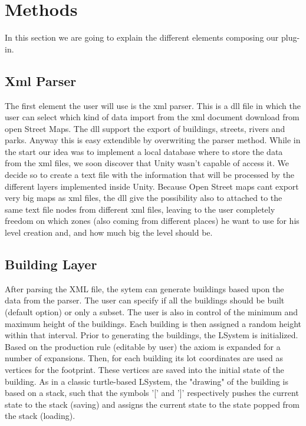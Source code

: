 \documentclass[conference]{IEEEtran}
\begin{document}
\section{Methods}

In this section we are going to explain the different elements composing our plug-in.

\subsection{Xml Parser}

The first element the user will use is the xml parser. This is a dll file in which the user can select which kind of data import from the xml document download from open Street Maps. The dll support the export of buildings, streets, rivers and parks. Anyway this is easy extendible by overwriting the parser method.
While in the start our idea was to implement a local database where to store the data from the xml files, we soon discover that Unity wasn't capable of access it. We decide so to create a text file with the information that will be processed by the different layers implemented inside Unity. Because Open Street maps cant export very big maps as xml files, the dll give the possibility also to attached to the same text file nodes from different xml files, leaving to the user completely freedom on which zones (also coming from different places) he want to use for his level creation and, and how much big the level should be.

\subsection{Building Layer}
After parsing the XML file, the sytem can generate buildings based upon the data from the parser. The user can specify if all the buildings should be built (default option) or only a subset. The user is also in control of the minimum and maximum height of the buildings. Each building is then assigned a random height within that interval. Prior to generating the buildings, the LSystem is initialized. Based on the production rule (editable by user) the axiom is expanded for a number of expansions. Then, for each building its lot coordinates are used as vertices for the footprint. These vertices are saved into the initial state of the building. As in a classic turtle-based LSystem, the "drawing" of the building is based on a stack, such that the symbols '[' and ']' respectively pushes the current state to the stack (saving) and assigns the current state to the state popped from the stack (loading). \newline
\end{document}

